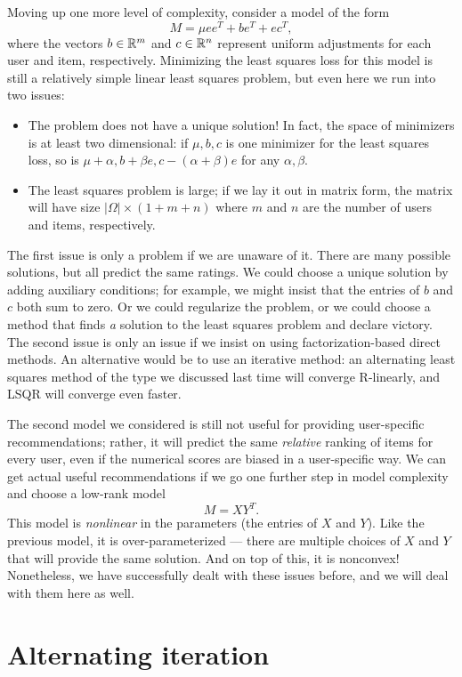 \documentclass[12pt, leqno]{article} %
\begin{document}
Moving up one more level of complexity, consider a model of
the form
\[
  M = \mu ee^T + be^T + ec^T,
\]
where the vectors $b \in \mathbb{R}^m$ and $c \in \mathbb{R}^n$ represent
uniform adjustments for each user and item, respectively.
Minimizing the least squares loss for this model is still
a relatively simple linear least squares problem, but even
here we run into two issues:
\begin{itemize}
\item
  The problem does not have a unique solution!  In fact, the space of
  minimizers is at least two dimensional: if $\mu, b, c$ is one
  minimizer for the least squares loss, so is
  $\mu + \alpha, b + \beta e, c - (\alpha + \beta) e$ for
  any $\alpha, \beta$.
\item
  The least squares problem is large; if we lay it out in matrix form,
  the matrix will have size $|\Omega| \times (1+m+n)$ where $m$ and
  $n$ are the number of users and items, respectively.
\end{itemize}
The first issue is only a problem if we are unaware of it.  There are
many possible solutions, but all predict the same ratings.  We could
choose a unique solution by adding auxiliary conditions; for example,
we might insist that the entries of $b$ and $c$ both sum to zero.
Or we could regularize the problem, or we could choose a method that
finds {\em a} solution to the least squares problem and declare
victory.  The second issue is only an issue if we insist on using
factorization-based direct methods.  An alternative would be to use
an iterative method: an alternating least squares method of the type
we discussed last time will converge R-linearly, and LSQR will
converge even faster.

The second model we considered is still not useful for providing
user-specific recommendations; rather, it will predict the
same {\em relative} ranking of items for every user, even if the
numerical scores are biased in a user-specific way.  We can get
actual useful recommendations if we go one further step in model
complexity and choose a low-rank model
\[
  M = XY^T.
\]
This model is {\em nonlinear} in the parameters (the entries of $X$
and $Y$).  Like the previous model, it is over-parameterized ---
there are multiple choices of $X$ and $Y$ that will provide the
same solution.  And on top of this, it is nonconvex!  Nonetheless,
we have successfully dealt with these issues before, and we will
deal with them here as well.

\section{Alternating iteration}
\end{document}
